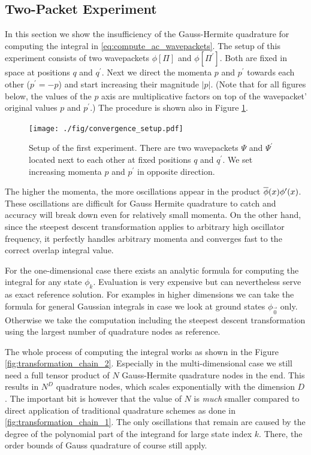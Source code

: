 \documentclass[a4paper,10pt]{article}
\begin{document}
\subsection{Two-Packet Experiment}


In this section we show the insufficiency of the Gauss-Hermite quadrature
for computing the integral in \eqref{eq:compute_ac_wavepackets}. The setup
of this experiment consists of two wavepackets $\phi[\Pi]$ and $\phi[\Pi^\prime]$.
Both are fixed in space at positions $q$ and $q^\prime$. Next we direct the
momenta $p$ and $p^\prime$ towards each other ($p^\prime = -p$) and start
increasing their magnitude $|p|$. (Note that for all figures below, the values
of the $p$ axis are multiplicative factors on top of the wavepacket' original
values $p$ and $p^\prime$.)
The procedure is shown also in Figure \ref{fig:convergence_setup}.

\begin{figure}[h!]
  \centering
  \texttt{[image: ./fig/convergence\_setup.pdf]}
  \caption{Setup of the first experiment. There are two wavepackets $\Psi$
    and $\Psi^\prime$ located next to each other at fixed positions $q$ and
    $q^\prime$. We set increasing momenta $p$ and $p^\prime$
    in opposite direction.}
  \label{fig:convergence_setup}
\end{figure}

The higher the momenta, the more oscillations appear in the product $\overline{\phi}(x) \phi^\prime(x)$.
These oscillations are difficult for Gauss Hermite quadrature to catch and accuracy
will break down even for relatively small momenta. On the other hand, since the
steepest descent transformation applies to arbitrary high oscillator frequency,
it perfectly handles arbitrary momenta and converges fast to the correct
overlap integral value.

For the one-dimensional case there exists an analytic formula for computing
the integral for any state $\phi_k$. Evaluation is very expensive but can nevertheless
serve as exact reference solution. For examples in higher dimensions we can take
the formula for general Gaussian integrals in case we look at ground states
$\phi_{\vec{0}}$ only. Otherwise we take the computation including the steepest
descent transformation using the largest number of quadrature nodes as reference.

The whole process of computing the integral works as shown in the Figure
\ref{fig:transformation_chain_2}. Especially in the multi-dimensional case
we still need a full tensor product of $N$ Gauss-Hermite quadrature nodes in the end.
This results in $N^D$ quadrature nodes, which scales exponentially with the
dimension $D$. The important bit is however that the value of $N$ is \emph{much}
smaller compared to direct application of traditional quadrature schemes as done
in \ref{fig:transformation_chain_1}.
The only oscillations that remain are caused by the degree of the polynomial part
of the integrand for large state index $k$. There, the order bounds of Gauss
quadrature of course still apply.
\end{document}
